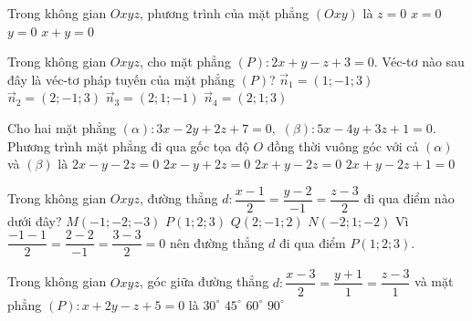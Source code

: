 \begin{ex}%
Trong không gian $Oxyz$, phương trình của mặt phẳng $(Oxy)$ là
\choice
{\True $z=0$}
{$x=0$}
{$y=0$}
{$x+y=0$}
\end{ex}

\begin{ex}%
Trong không gian $Oxyz$, cho mặt phẳng $(P)\colon 2x+y-z+3=0$. Véc-tơ nào sau đây là véc-tơ pháp tuyến của mặt phẳng $(P)$?
\choice
{$\overrightarrow{n}_1=(1;-1;3)$}
{$\overrightarrow{n}_2=(2;-1;3)$}
{\True $\overrightarrow{n}_3=(2;1;-1)$}
{ $\overrightarrow{n}_4=(2;1;3)$}
\end{ex}

\begin{ex}%
Cho hai mặt phẳng $(\alpha)\colon  3 x-2 y+2 z+7=0,$ $(\beta)\colon 5 x-4 y+3 z+1=0$. Phương trình mặt phẳng đi qua gốc tọa độ $O$ đồng thời vuông góc với cả $(\alpha)$ và $(\beta)$ là
\choice
{$2 x-y-2 z=0$}
{$2 x-y+2 z=0$}
{\True $2 x+y-2 z=0$}
{$2 x+y-2 z+1=0$}
\end{ex}

\begin{ex}%
Trong không gian $Oxyz$, đường thẳng $d\colon \dfrac{x-1}{2}=\dfrac{y-2}{-1}=\dfrac{z-3}{2}$ đi qua điểm nào dưới đây?
\choice
{$M(-1;-2;-3)$}
{\True $P(1;2;3)$}
{$Q(2;-1;2)$}
{$N(-2;1;-2)$}
\loigiai
{
Vì $\dfrac{-1-1}{2}=\dfrac{2-2}{-1}=\dfrac{3-3}{2}=0$ nên đường thẳng $d$ đi qua điểm $P(1;2;3)$.
}
\end{ex}

\begin{ex}%
Trong không gian $Oxyz$, góc giữa đường thẳng $d:\dfrac{x-3}{2}=\dfrac{y+1}{1}=\dfrac{z-3}{1}$ và mặt phẳng  $(P):x+2y-z+5=0$ là
\choice
{\True $30^{\circ}$}
{ $45^{\circ}$}
{$60^{\circ}$}
{$90^{\circ}$}
\end{ex}

